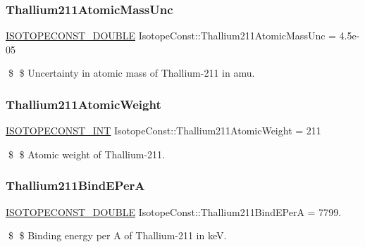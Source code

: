 \subsubsection{\texorpdfstring{Thallium211\+Atomic\+Mass\+Unc}{Thallium211AtomicMassUnc}}
{\footnotesize\ttfamily \mbox{\hyperlink{group___isotope_const-_macros_ga8f45a7272ce02c0b4c65c44636ed719a}{I\+S\+O\+T\+O\+P\+E\+C\+O\+N\+S\+T\+\_\+\+D\+O\+U\+B\+LE}} Isotope\+Const\+::\+Thallium211\+Atomic\+Mass\+Unc = 4.\+5e-\/05}

\$ \$ Uncertainty in atomic mass of Thallium-\/211 in amu. \mbox{\label{group___isotope_const-_thallium-_tl211_ga69ea896b15e242f8d34d74ca4f42c28e}} 
\subsubsection{\texorpdfstring{Thallium211\+Atomic\+Weight}{Thallium211AtomicWeight}}
{\footnotesize\ttfamily \mbox{\hyperlink{group___isotope_const-_macros_ga5f18360b3e99483a35c32d789e62621c}{I\+S\+O\+T\+O\+P\+E\+C\+O\+N\+S\+T\+\_\+\+I\+NT}} Isotope\+Const\+::\+Thallium211\+Atomic\+Weight = 211}

\$ \$ Atomic weight of Thallium-\/211. \mbox{\label{group___isotope_const-_thallium-_tl211_ga945e7cb0699e06636f20eed5c654e740}} 
\subsubsection{\texorpdfstring{Thallium211\+Bind\+E\+PerA}{Thallium211BindEPerA}}
{\footnotesize\ttfamily \mbox{\hyperlink{group___isotope_const-_macros_ga8f45a7272ce02c0b4c65c44636ed719a}{I\+S\+O\+T\+O\+P\+E\+C\+O\+N\+S\+T\+\_\+\+D\+O\+U\+B\+LE}} Isotope\+Const\+::\+Thallium211\+Bind\+E\+PerA = 7799.}

\$ \$ Binding energy per A of Thallium-\/211 in keV. \mbox{\label{group___isotope_const-_thallium-_tl211_ga10b2868c63d7b3c18cc2658d596340ed}} 
